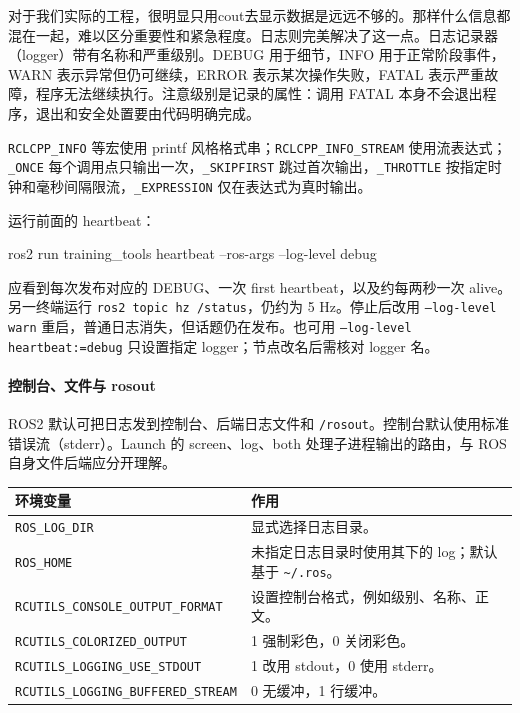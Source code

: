 对于我们实际的工程，很明显只用cout去显示数据是远远不够的。那样什么信息都混在一起，难以区分重要性和紧急程度。日志则完美解决了这一点。日志记录器（logger）带有名称和严重级别。DEBUG 用于细节，INFO 用于正常阶段事件，WARN 表示异常但仍可继续，ERROR 表示某次操作失败，FATAL 表示严重故障，程序无法继续执行。注意级别是记录的属性：调用 FATAL 本身不会退出程序，退出和安全处置要由代码明确完成。

\texttt{RCLCPP\_INFO} 等宏使用 printf 风格格式串；\texttt{RCLCPP\_INFO\_STREAM} 使用流表达式；\texttt{\_ONCE} 每个调用点只输出一次，\texttt{\_SKIPFIRST} 跳过首次输出，\texttt{\_THROTTLE} 按指定时钟和毫秒间隔限流，\texttt{\_EXPRESSION} 仅在表达式为真时输出。

\begin{example}
运行前面的 heartbeat：
\par\medskip\noindent\begin{minipage}{\linewidth}
\begin{tbash}
ros2 run training_tools heartbeat --ros-args --log-level debug
\end{tbash}
\end{minipage}\par\smallskip
应看到每次发布对应的 DEBUG、一次 first heartbeat，以及约每两秒一次 alive。另一终端运行 \texttt{ros2 topic hz /status}，仍约为 5 Hz。停止后改用 \texttt{--log-level warn} 重启，普通日志消失，但话题仍在发布。也可用 \texttt{--log-level heartbeat:=debug} 只设置指定 logger；节点改名后需核对 logger 名。
\end{example}

\paragraph*{控制台、文件与 rosout}
ROS2 默认可把日志发到控制台、后端日志文件和 \texttt{/rosout}。控制台默认使用标准错误流（stderr）。Launch 的 screen、log、both 处理子进程输出的路由，与 ROS 自身文件后端应分开理解。

\begin{center}
\begin{tabular}{p{}p{}}
\toprule[1.5pt]
环境变量 & 作用 \\
\midrule[1pt]
\texttt{ROS\_LOG\_DIR} & 显式选择日志目录。\\
\texttt{ROS\_HOME} & 未指定日志目录时使用其下的 log；默认基于 \nolinkurl{~/.ros}。\\
\nolinkurl{RCUTILS_CONSOLE_OUTPUT_FORMAT} & 设置控制台格式，例如级别、名称、正文。\\
\nolinkurl{RCUTILS_COLORIZED_OUTPUT} & 1 强制彩色，0 关闭彩色。\\
\nolinkurl{RCUTILS_LOGGING_USE_STDOUT} & 1 改用 stdout，0 使用 stderr。\\
\nolinkurl{RCUTILS_LOGGING_BUFFERED_STREAM} & 0 无缓冲，1 行缓冲。\\
\bottomrule[1.5pt]
\end{tabular}
\end{center}

